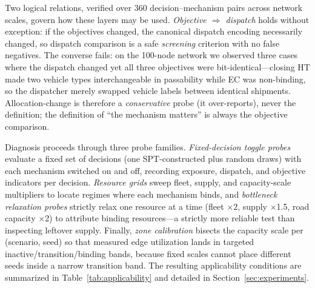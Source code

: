 \documentclass[10pt,conference,letterpaper]{IEEEtran}
\begin{document}
Two logical relations, verified over 360 decision--mechanism pairs across
network scales, govern how these layers may be used.
\emph{Objective $\Rightarrow$ dispatch} holds without exception: if the
objectives changed, the canonical dispatch encoding necessarily changed,
so dispatch comparison is a safe \emph{screening} criterion with no false
negatives. The converse fails: on the 100-node network we observed three
cases where the dispatch changed yet all three objectives were
bit-identical---closing HT made two vehicle types interchangeable in
passability while EC was non-binding, so the dispatcher merely swapped
vehicle labels between identical shipments. Allocation-change is
therefore a \emph{conservative} probe (it over-reports), never the
definition; the definition of ``the mechanism matters'' is always the
objective comparison.

Diagnosis proceeds through three probe families.
\emph{Fixed-decision toggle probes} evaluate a fixed set of decisions
(one SPT-constructed plus random draws) with each mechanism switched on
and off, recording exposure, dispatch, and objective indicators per
decision. \emph{Resource grids} sweep fleet, supply, and capacity-scale
multipliers to locate regimes where each mechanism binds, and
\emph{bottleneck relaxation probes} strictly relax one resource at a time
(fleet $\times2$, supply $\times$1.5, road capacity $\times$2) to attribute
binding resources---a strictly more reliable test than inspecting
leftover supply. Finally, \emph{zone calibration} bisects the capacity
scale per (scenario, seed) so that measured edge utilization lands in
targeted inactive/transition/binding bands, because fixed scales cannot
place different seeds inside a narrow transition band. The resulting
applicability conditions are summarized in
Table~\ref{tab:applicability} and detailed in
Section~\ref{sec:experiments}.
\end{document}
